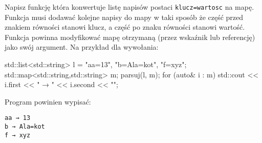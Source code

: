 % 
% 
% 
% 



\dbEntryCheckResults
Napisz funkcję która konwertuje listę napisów postaci \Verb#klucz=wartosc# na mapę.
Funkcja musi dodawać kolejne napisy do mapy w taki sposób że część przed znakiem równości stanowi klucz, a część po znaku równości stanowi wartość.
Funkcja powinna modyfikować mapę otrzymaną (przez wskaźnik lub referencję) jako swój argument. Na przykład dla wywołania:
\begin{CodeFrame*}[cpp]{}
std::list<std::string> l = {"aa=13", "b=Ala=kot", "f=xyz"};
std::map<std::string,std::string> m;
parsuj(l, m);
for (auto& i : m)  std::cout << i.first << " → " << i.second << "\n";
\end{CodeFrame*}
\vspace{-8pt}Program powinien wypisać:
\vspace{-8pt}\begin{Verbatim}
aa → 13
b → Ala=kot
f → xyz
\end{Verbatim}
\fi

